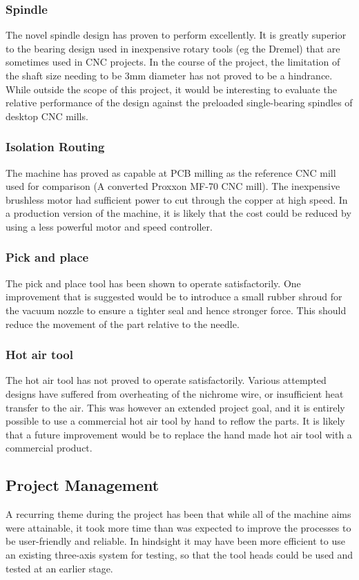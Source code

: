 \subsubsection{Spindle}
The novel spindle design has proven to perform excellently. It is greatly
superior to the bearing design used in inexpensive rotary tools (eg the Dremel)
that are sometimes used in CNC projects. In the course of the project, the
limitation of the shaft size needing to be 3mm diameter has not proved to
be a hindrance. While outside the scope of this project, it would be
interesting to evaluate the relative performance of the design against
the preloaded single-bearing spindles of desktop CNC mills.

\subsubsection{Isolation Routing}
The machine has proved as capable at PCB milling as the reference CNC
mill used for comparison (A converted Proxxon MF-70 CNC mill). The
inexpensive brushless motor had sufficient power to cut through the copper
at high speed. In a production version of the machine, it is likely that
the cost could be reduced by using a less powerful motor and speed
controller.

\subsubsection{Pick and place}
The pick and place tool has been shown to operate satisfactorily. One
improvement that is suggested would be to introduce a small rubber shroud
for the vacuum nozzle to ensure a tighter seal and hence stronger force.
This should reduce the movement of the part relative to the needle.

\subsubsection{Hot air tool}
The hot air tool has not proved to operate satisfactorily. Various
attempted designs have suffered from overheating of the nichrome wire,
or insufficient heat transfer to the air. This was however an extended
project goal, and it is entirely possible to use a commercial hot air tool
by hand to reflow the parts. It is likely that a future improvement would
be to replace the hand made hot air tool with a commercial product.

\subsection{Project Management}
A recurring theme during the project has been that while all of the machine
aims were attainable, it took more time than was expected to improve
the processes to be user-friendly and reliable. In hindsight it may
have been more efficient to use an existing three-axis system for testing,
so that the tool heads could be used and tested at an earlier stage.

